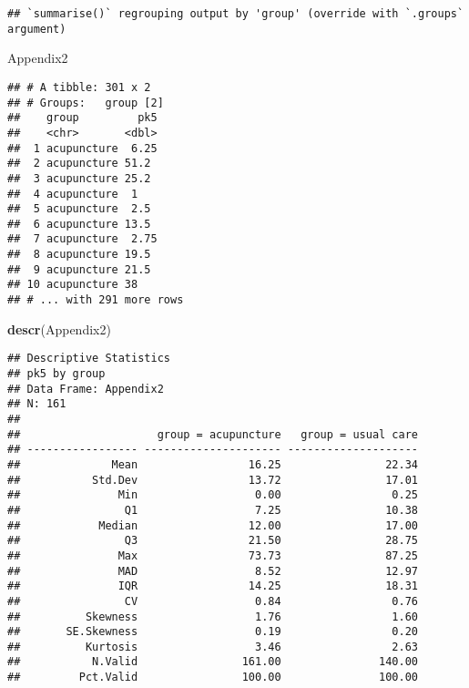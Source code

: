 \documentclass[
]{article}
\newenvironment{Shaded}{\begin{snugshade}}{\end{snugshade}}
\newcommand{\KeywordTok}[1]{\textcolor[rgb]{0.13,0.29,0.53}{\textbf{#1}}}
\newcommand{\NormalTok}[1]{#1}
\begin{document}
\begin{verbatim}
## `summarise()` regrouping output by 'group' (override with `.groups` argument)
\end{verbatim}

\begin{Shaded}
\begin{Highlighting}[]
\NormalTok{Appendix2}
\end{Highlighting}
\end{Shaded}

\begin{verbatim}
## # A tibble: 301 x 2
## # Groups:   group [2]
##    group         pk5
##    <chr>       <dbl>
##  1 acupuncture  6.25
##  2 acupuncture 51.2 
##  3 acupuncture 25.2 
##  4 acupuncture  1   
##  5 acupuncture  2.5 
##  6 acupuncture 13.5 
##  7 acupuncture  2.75
##  8 acupuncture 19.5 
##  9 acupuncture 21.5 
## 10 acupuncture 38   
## # ... with 291 more rows
\end{verbatim}

\begin{Shaded}
\begin{Highlighting}[]
\KeywordTok{descr}\NormalTok{(Appendix2)}
\end{Highlighting}
\end{Shaded}

\begin{verbatim}
## Descriptive Statistics  
## pk5 by group  
## Data Frame: Appendix2  
## N: 161  
## 
##                     group = acupuncture   group = usual care
## ----------------- --------------------- --------------------
##              Mean                 16.25                22.34
##           Std.Dev                 13.72                17.01
##               Min                  0.00                 0.25
##                Q1                  7.25                10.38
##            Median                 12.00                17.00
##                Q3                 21.50                28.75
##               Max                 73.73                87.25
##               MAD                  8.52                12.97
##               IQR                 14.25                18.31
##                CV                  0.84                 0.76
##          Skewness                  1.76                 1.60
##       SE.Skewness                  0.19                 0.20
##          Kurtosis                  3.46                 2.63
##           N.Valid                161.00               140.00
##         Pct.Valid                100.00               100.00
\end{verbatim}
\end{document}
